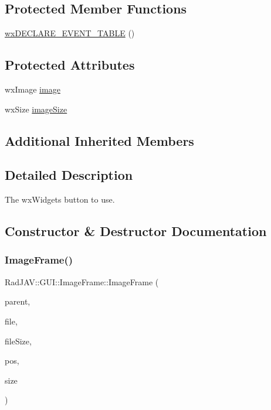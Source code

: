 \subsection*{Protected Member Functions}
\begin{DoxyCompactItemize}
\item 
\mbox{\hyperlink{class_rad_j_a_v_1_1_g_u_i_1_1_image_frame_a48c05ae0f5dbdcbf62443e08c5e34e13}{wx\+D\+E\+C\+L\+A\+R\+E\+\_\+\+E\+V\+E\+N\+T\+\_\+\+T\+A\+B\+LE}} ()
\end{DoxyCompactItemize}
\subsection*{Protected Attributes}
\begin{DoxyCompactItemize}
\item 
wx\+Image \mbox{\hyperlink{class_rad_j_a_v_1_1_g_u_i_1_1_image_frame_a4f733f6b16d9a114bba5898583586f9d}{image}}
\item 
wx\+Size \mbox{\hyperlink{class_rad_j_a_v_1_1_g_u_i_1_1_image_frame_a60f963a93b1f6b76c84531a6f9854267}{image\+Size}}
\end{DoxyCompactItemize}
\subsection*{Additional Inherited Members}


\subsection{Detailed Description}
The wx\+Widgets button to use. 

\subsection{Constructor \& Destructor Documentation}
\mbox{\label{class_rad_j_a_v_1_1_g_u_i_1_1_image_frame_af019c33222b11c3e24b378c458d3284c}} 
\subsubsection{\texorpdfstring{Image\+Frame()}{ImageFrame()}}
{\footnotesize\ttfamily Rad\+J\+A\+V\+::\+G\+U\+I\+::\+Image\+Frame\+::\+Image\+Frame (\begin{DoxyParamCaption}\item[{wx\+Window $\ast$}]{parent,  }\item[{const wx\+String \&}]{file,  }\item[{wx\+Size}]{file\+Size,  }\item[{const wx\+Point \&}]{pos,  }\item[{const wx\+Size \&}]{size }\end{DoxyParamCaption})}



